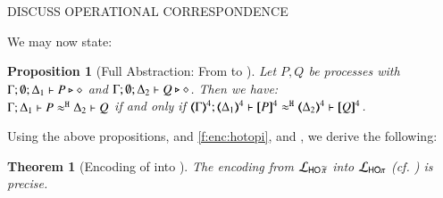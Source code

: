 \documentclass[preprint,11pt]{elsarticle}
\newtheorem{proposition}{Proposition}[section]
\newtheorem{theorem}{Theorem}[section]
\begin{document}
{{%
%

DISCUSS OPERATIONAL CORRESPONDENCE

We may now state:


\begin{proposition}[Full Abstraction: From \PHOp to \HOp]%
	\label{prop:fulla_pHOp_to_HOp}
	Let $P, Q$ be \PHOp processes with $\Gamma; \emptyset; \Delta_1 \vdash P \triangleright \diamond$ and 
	$\Gamma; \emptyset; \Delta_2 \vdash Q \triangleright \diamond$. Then we have: \\
	$\Gamma; \Delta_1 \vdash P \approx^\mathtt{H} \Delta_2 \vdash Q$ if and only if $\horel{\tmap{\Gamma}{4}}{\tmap{\Delta_1}{4}}{\pmap{P}{4}}{\hwb}{\tmap{\Delta_2}{4}}{\pmap{Q}{4}}$.
\end{proposition}

Using the above propositions,  
and 
\ref{f:enc:hotopi},
and , 
we derive the following: 
\begin{theorem}[Encoding of \PHOp into \HOp]
	\label{f:enc:phopiptohopi}
	The encoding from
		$\mathcal{L}_{\mathsf{HO}\,{\widetilde{\pi}}}$ into $\mathcal{L}_{\mathsf{HO}\pi}$ (cf. )
	is precise. 
\end{theorem}

}}
\end{document}
